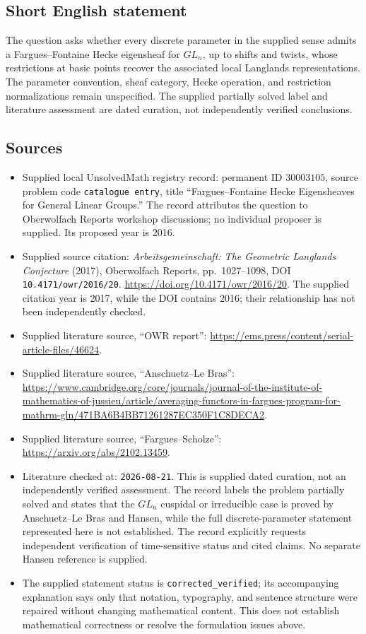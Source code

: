 \documentclass[11pt]{article}
\begin{document}
\subsection{Short English statement}
The question asks whether every discrete parameter in the supplied sense admits a Fargues--Fontaine Hecke eigensheaf for \(GL_n\), up to shifts and twists, whose restrictions at basic points recover the associated local Langlands representations. The parameter convention, sheaf category, Hecke operation, and restriction normalizations remain unspecified. The supplied partially solved label and literature assessment are dated curation, not independently verified conclusions.
\subsection{Sources}
\begin{itemize}
\item Supplied local UnsolvedMath registry record: permanent ID \(30003105\), source problem code \texttt{catalogue entry}, title ``Fargues--Fontaine Hecke Eigensheaves for General Linear Groups.'' The record attributes the question to Oberwolfach Reports workshop discussions; no individual proposer is supplied. Its proposed year is 2016.
\item Supplied source citation: \emph{Arbeitsgemeinschaft: The Geometric Langlands Conjecture} (2017), Oberwolfach Reports, pp.~1027--1098, DOI \texttt{10.4171/owr/2016/20}. \url{https://doi.org/10.4171/owr/2016/20}. The supplied citation year is 2017, while the DOI contains 2016; their relationship has not been independently checked.
\item Supplied literature source, ``OWR report'': \url{https://ems.press/content/serial-article-files/46624}.
\item Supplied literature source, ``Anschuetz--Le Bras'': \url{https://www.cambridge.org/core/journals/journal-of-the-institute-of-mathematics-of-jussieu/article/averaging-functors-in-fargues-program-for-mathrm-gln/471BA6B4BB71261287EC350F1C8DECA2}.
\item Supplied literature source, ``Fargues--Scholze'': \url{https://arxiv.org/abs/2102.13459}.
\item Literature checked at: \texttt{2026-08-21}. This is supplied dated curation, not an independently verified assessment. The record labels the problem partially solved and states that the \(GL_n\) cuspidal or irreducible case is proved by Anschuetz--Le Bras and Hansen, while the full discrete-parameter statement represented here is not established. The record explicitly requests independent verification of time-sensitive status and cited claims. No separate Hansen reference is supplied.
\item The supplied statement status is \texttt{corrected\_verified}; its accompanying explanation says only that notation, typography, and sentence structure were repaired without changing mathematical content. This does not establish mathematical correctness or resolve the formulation issues above.
\end{itemize}
\end{document}
